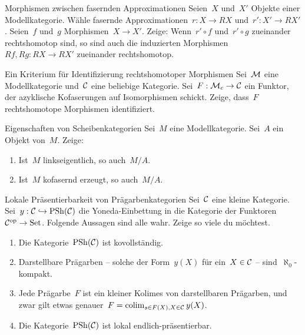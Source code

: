 \documentclass{uebblatt}
\begin{document}

\begin{aufgabe}{Morphismen zwischen fasernden Approximationen}
Seien~$X$ und~$X'$ Objekte einer Modellkategorie. Wähle fasernde
Approximationen~$r : X \to RX$ und~$r' : X' \to RX'$. Seien~$f$ und~$g$
Morphismen~$X \to X'$. Zeige: Wenn~$r' \circ f$ und~$r' \circ g$ zueinander
rechtshomotop sind, so sind auch die induzierten Morphismen~$Rf, Rg : RX \to
RX'$ zueinander rechtshomotop.
\end{aufgabe}

\begin{aufgabe}{Ein Kriterium für Identifizierung rechtshomotoper Morphismen}
Sei~$\mathcal{M}$ eine Modellkategorie und~$\mathcal{C}$ eine beliebige Kategorie. Sei~$F : \mathcal{M}_c
\to \mathcal{C}$ ein Funktor, der azyklische Kofaserungen auf Isomorphismen schickt.
Zeige, dass~$F$ rechtshomotope Morphismen identifiziert.
\end{aufgabe}

\begin{aufgabe}{Eigenschaften von Scheibenkategorien}
Sei~$M$ eine Modellkategorie. Sei~$A$ ein Objekt von~$M$. Zeige:
\begin{enumerate}
\item Ist~$M$ linkseigentlich, so auch~$M/A$.
\item Ist~$M$ kofasernd erzeugt, so auch~$M/A$.
\end{enumerate}
\end{aufgabe}

\begin{aufgabe}{Lokale Präsentierbarkeit von Prägarbenkategorien}
Sei~$\mathcal{C}$ eine kleine Kategorie. Sei~$y : \mathcal{C} \hookrightarrow \mathrm{PSh}(\mathcal{C})$ die
Yoneda-Einbettung in die Kategorie der Funktoren~$\mathcal{C}^{\mathrm{op}} \to \mathrm{Set}$.
Folgende Aussagen sind alle wahr. Zeige so viele
du möchtest.
\begin{enumerate}
\item Die Kategorie~$\mathrm{PSh}(\mathcal{C})$ ist kovollständig.
\item Darstellbare Prägarben -- solche der Form~$y(X)$ für ein~$X \in \mathcal{C}$ --
sind~$\aleph_0$-kompakt.
\item Jede Prägarbe~$F$ ist ein kleiner Kolimes von darstellbaren Prägarben,
und zwar gilt etwas genauer~$F = \operatorname*{colim}_{s \in F(X), X \in \mathcal{C}} y(X)$.
\item Die Kategorie~$\mathrm{PSh}(\mathcal{C})$ ist lokal endlich-präsentierbar.
\end{enumerate}
\end{aufgabe}
\end{document}
